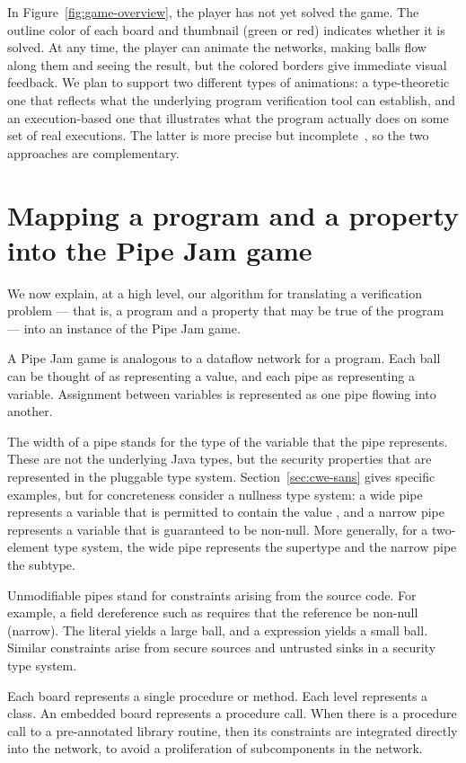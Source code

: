 \documentclass{sig-alternate}
\def\<#1>{\codeid{#1}}
\newcommand{\codeid}[1]{\ifmmode{\mbox{\ttfamily{#1}}}\else{\ttfamily #1}\fi}
\begin{document}
In Figure~\ref{fig:game-overview}, the player has not yet solved the
game.  The outline color of each board and thumbnail (green or red)
indicates whether it is solved.  At any time, the player can animate
the networks, making balls flow along them and seeing the result, but
the colored borders give immediate visual feedback.  We plan to
support two different types of animations: a type-theoretic one that
reflects what the underlying program verification tool can establish,
and an execution-based one that illustrates what the program actually
does on some set of real executions.  The latter is more precise but
incomplete~\cite{Ernst2003:WODA}, so the two approaches are
complementary.


\section{Mapping a program and a property into the Pipe Jam game}

We now explain, at a high level, our algorithm for translating a
verification problem --- that is, a program and a property that may be
true of the program --- into an instance of the Pipe Jam game.

A Pipe Jam game is analogous to a dataflow network for a program.
Each ball can be thought of as representing a value, and each pipe as
representing a variable.  Assignment between variables is represented
as one pipe flowing into another.

The width of a pipe stands for the type of the variable that the pipe
represents.  These are not the underlying Java types, but the security
properties that are represented in the pluggable type system.
Section~\ref{sec:cwe-sans} gives specific examples, but for
concreteness consider a nullness type system: a wide pipe represents a
variable that is permitted to contain the value \<null>, and a narrow
pipe represents a variable that is guaranteed to be non-null.  More
generally, for a two-element type system, the wide pipe represents the
supertype and the narrow pipe the subtype.

Unmodifiable pipes stand for constraints arising from the source code.
For example, a field dereference such as \<x.f> requires that the
reference \<x> be non-null (narrow).  The literal \<null> yields a
large ball, and a \<new> expression yields a small ball.  Similar
constraints arise from secure sources and untrusted sinks in a
security type system.

Each board represents a single procedure or method.  Each level
represents a class.  An embedded board represents a procedure call.
When there is a procedure call to a pre-annotated library routine,
then its constraints are integrated directly into the network, to
avoid a proliferation of subcomponents in the network.
\end{document}
